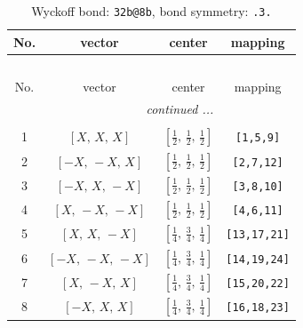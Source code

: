 \documentclass[fleqn,8pt]{jsarticle}
\begin{document}
\renewcommand{\arraystretch}{1.2}
\begin{longtable}{cccc}
\caption{Wyckoff bond: {\tt 32b@8b}, bond symmetry: {\tt .3.}}
 \\
 \hline \hline
No. & vector & center & mapping \\ \hline \endfirsthead

\multicolumn{3}{l}{\tablename\ \thetable{}} \\
 \hline \hline
No. & vector & center & mapping \\ \hline \endhead

 \hline \hline
\multicolumn{3}{r}{\footnotesize\it continued ...} \\ \endfoot

 \hline \hline
\multicolumn{3}{r}{} \\ \endlastfoot

1 & $\left[ X,\, X,\, X \right]$ & $\left[ \frac{1}{2},\, \frac{1}{2},\, \frac{1}{2} \right]$ & {\tt [1,5,9]} \\ \hline
2 & $\left[ - X,\, - X,\, X \right]$ & $\left[ \frac{1}{2},\, \frac{1}{2},\, \frac{1}{2} \right]$ & {\tt [2,7,12]} \\ \hline
3 & $\left[ - X,\, X,\, - X \right]$ & $\left[ \frac{1}{2},\, \frac{1}{2},\, \frac{1}{2} \right]$ & {\tt [3,8,10]} \\ \hline
4 & $\left[ X,\, - X,\, - X \right]$ & $\left[ \frac{1}{2},\, \frac{1}{2},\, \frac{1}{2} \right]$ & {\tt [4,6,11]} \\ \hline
5 & $\left[ X,\, X,\, - X \right]$ & $\left[ \frac{1}{4},\, \frac{3}{4},\, \frac{1}{4} \right]$ & {\tt [13,17,21]} \\ \hline
6 & $\left[ - X,\, - X,\, - X \right]$ & $\left[ \frac{1}{4},\, \frac{3}{4},\, \frac{1}{4} \right]$ & {\tt [14,19,24]} \\ \hline
7 & $\left[ X,\, - X,\, X \right]$ & $\left[ \frac{1}{4},\, \frac{3}{4},\, \frac{1}{4} \right]$ & {\tt [15,20,22]} \\ \hline
8 & $\left[ - X,\, X,\, X \right]$ & $\left[ \frac{1}{4},\, \frac{3}{4},\, \frac{1}{4} \right]$ & {\tt [16,18,23]} \\
\end{longtable}
\renewcommand{\arraystretch}{1.2}
\end{document}
